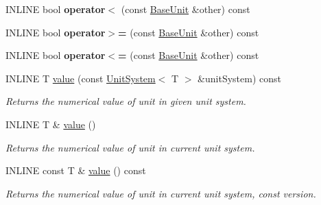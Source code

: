 \begin{DoxyCompactItemize}
\item 
\hypertarget{classBaseUnit_ac02495e927de902fbcd4124b4c04d797}{}\label{classBaseUnit_ac02495e927de902fbcd4124b4c04d797} 
I\+N\+L\+I\+NE bool {\bfseries operator$<$} (const \hyperlink{classBaseUnit}{Base\+Unit} \&other) const
\item 
\hypertarget{classBaseUnit_a213044f398d499fd7286fd80fdca64a3}{}\label{classBaseUnit_a213044f398d499fd7286fd80fdca64a3} 
I\+N\+L\+I\+NE bool {\bfseries operator$>$=} (const \hyperlink{classBaseUnit}{Base\+Unit} \&other) const
\item 
\hypertarget{classBaseUnit_ad04df784ecf6d474ba7ef84e1d73ac14}{}\label{classBaseUnit_ad04df784ecf6d474ba7ef84e1d73ac14} 
I\+N\+L\+I\+NE bool {\bfseries operator$<$=} (const \hyperlink{classBaseUnit}{Base\+Unit} \&other) const
\item 
\hypertarget{classBaseUnit_aa3dc52fe14cd20852d3de289c39db230}{}\label{classBaseUnit_aa3dc52fe14cd20852d3de289c39db230} 
I\+N\+L\+I\+NE T \hyperlink{classBaseUnit_aa3dc52fe14cd20852d3de289c39db230}{value} (const \hyperlink{classUnitSystem}{Unit\+System}$<$ T $>$ \&unit\+System) const
\begin{DoxyCompactList}\small\item\em Returns the numerical value of unit in given unit system. \end{DoxyCompactList}\item 
\hypertarget{classBaseUnit_a83b6c208608cdc13c94212d009c77829}{}\label{classBaseUnit_a83b6c208608cdc13c94212d009c77829} 
I\+N\+L\+I\+NE T \& \hyperlink{classBaseUnit_a83b6c208608cdc13c94212d009c77829}{value} ()
\begin{DoxyCompactList}\small\item\em Returns the numerical value of unit in current unit system. \end{DoxyCompactList}\item 
\hypertarget{classBaseUnit_a76b084a9bc654e59d8d146c2f78e033a}{}\label{classBaseUnit_a76b084a9bc654e59d8d146c2f78e033a} 
I\+N\+L\+I\+NE const T \& \hyperlink{classBaseUnit_a76b084a9bc654e59d8d146c2f78e033a}{value} () const
\begin{DoxyCompactList}\small\item\em Returns the numerical value of unit in current unit system, const version. \end{DoxyCompactList}\end{DoxyCompactItemize}
